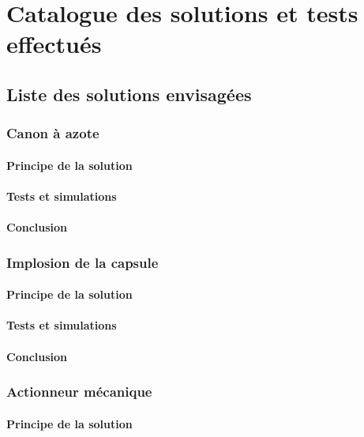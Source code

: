 \section{Catalogue des solutions et tests effectués}

\subsection{Liste des solutions envisagées}
\subsubsection{Canon à azote}
\paragraph{Principe de la solution}

\paragraph{Tests et simulations}

\paragraph{Conclusion}

\subsubsection{Implosion de la capsule}
\paragraph{Principe de la solution}

\paragraph{Tests et simulations}

\paragraph{Conclusion}


\subsubsection{Actionneur mécanique}
\paragraph{Principe de la solution}

